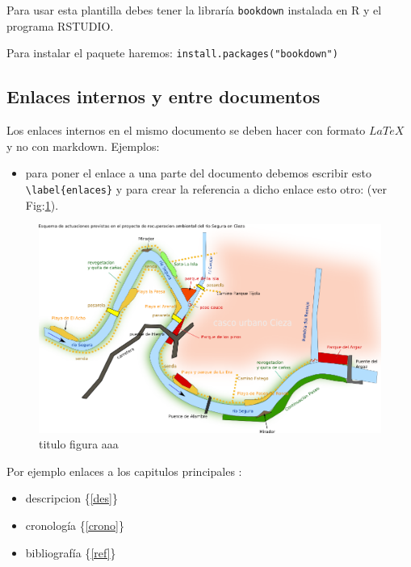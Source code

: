 \documentclass[10pt,spanish,a4paper,oneside]{article}
\providecommand{\tightlist}{%
  \setlength{\itemsep}{0pt}\setlength{\parskip}{0pt}}
\begin{document}
Para usar esta plantilla debes tener la libraría \texttt{bookdown}
instalada en R y el programa RSTUDIO.

Para instalar el paquete haremos: \texttt{install.packages("bookdown")}

\subsection{\texorpdfstring{Enlaces internos y entre documentos
\label{enlaces}}{Enlaces internos y entre documentos }}\label{enlaces-internos-y-entre-documentos}

Los enlaces internos en el mismo documento se deben hacer con formato
\(LaTeX\) y no con markdown. Ejemplos:

\begin{itemize}
\tightlist
\item
  para poner el enlace a una parte del documento debemos escribir esto
  \texttt{\textbackslash{}label\{enlaces\}} y para crear la referencia a
  dicho enlace esto otro: (ver Fig:\ref{fig_9}).
\end{itemize}

\begin{figure}[htbp]
\centering
\includegraphics{imag/portada.png}
\caption{titulo figura aaa \label{fig_9}}
\end{figure}

Por ejemplo enlaces a los capitulos principales :

\begin{itemize}
\tightlist
\item
  descripcion \{\ref{des}\}
\item
  cronología \{\ref{crono}\}
\item
  bibliografía \{\ref{ref}\}
\end{itemize}
\end{document}
